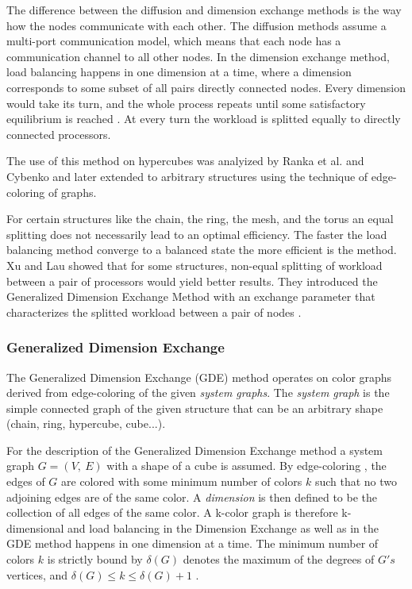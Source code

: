 \documentclass[DIV10, abstracton, openright, footsepline, headsepline, twoside, 9pt,
bigheadings]{scrreprt}
\begin{document}
The difference between the diffusion and dimension exchange methods is the way
how the nodes communicate with each other. The diffusion methods assume a multi-port
communication model, which means that each node has a communication channel to
all other nodes. In the dimension exchange method, load balancing happens in one
dimension at a time, where a dimension corresponds to some subset of all pairs
directly connected nodes. Every dimension would take its turn, and the whole
process repeats until some satisfactory equilibrium is reached \cite{Xu92}. At every
turn the workload is splitted equally to directly connected processors.

The use of this method on hypercubes was analyized by Ranka et al. \cite{Ranka88}
and Cybenko \cite{Cybenko89} and later extended to arbitrary structures using the
technique of edge-coloring of graphs.

For certain structures like the chain, the ring, the mesh, and the torus an equal
splitting does not necessarily lead to an optimal efficiency. The faster the load
balancing method converge to a balanced state the more efficient is the method.
Xu and Lau showed that for some structures, non-equal splitting of
workload between a pair of processors would yield better results. They introduced
the Generalized Dimension Exchange Method with an exchange parameter that characterizes
the splitted workload between a pair of nodes \cite{Xu92}.

\subsubsection{Generalized Dimension Exchange}
The Generalized Dimension Exchange (GDE) method operates on color graphs derived from
edge-coloring of the given \textit{system graphs}. The \textit{system graph} is
the simple connected graph of the given structure that can be an arbitrary shape
(chain, ring, hypercube, cube...).

For the  description of the Generalized Dimension
Exchange method a system graph $G = (V,\ E)$ with a shape of a cube is assumed.
By edge-coloring \cite{Fiorini78}, the edges of $G$ are colored with some minimum
number of colors $k$ such that no two adjoining edges are of the same color.
A \textit{dimension} is then defined to be the collection of all edges of the
same color. A k-color graph is therefore k-dimensional and load balancing
in the Dimension Exchange as well as in the GDE method happens in one dimension
 at  a time. The minimum number of colors $k$ is strictly bound by $\delta(G)$
denotes the maximum of the degrees of $G's$ vertices,
and $\delta(G) \leq k \leq \delta(G) + 1$ \cite{Fiorini78}.
\end{document}
